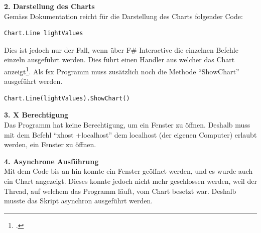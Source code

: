 \textbf{2. Darstellung des Charts} \\
Gemäss Dokumentation reicht für die Darstellung des Charts folgender Code:
\begin{lstlisting}
Chart.Line lightValues
\end{lstlisting}
Dies ist jedoch nur der Fall, wenn über F\# Interactive die einzelnen Befehle einzeln ausgeführt werden. Dies führt einen Handler aus welcher das Chart anzeigt\footcite{FSharp_Charting_Point_and_Line_Charts_2016-06-18}. Als fsx Programm muss zusätzlich noch die Methode "`ShowChart"' ausgeführt werden.

\begin{lstlisting}
Chart.Line(lightValues).ShowChart()
\end{lstlisting}

\textbf{3. X Berechtigung} \\
Das Programm hat keine Berechtigung, um ein Fenster zu öffnen. Deshalb muss mit dem Befehl "`xhost +localhost"' dem localhost (der eigenen Computer) erlaubt werden, ein Fenster zu öffnen.

\textbf{4. Asynchrone Ausführung} \\
Mit dem Code bis an hin konnte ein Fenster geöffnet werden, und es wurde auch ein Chart angezeigt. Dieses konnte jedoch nicht mehr geschlossen werden, weil der Thread, auf welchem das Programm läuft, vom Chart besetzt war. Deshalb musste das Skript asynchron ausgeführt werden.

